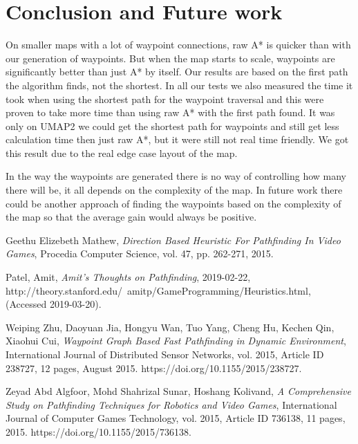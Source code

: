 \documentclass[a4paper]{article}
\begin{document}
{\section{Conclusion and Future work}
On smaller maps with a lot of waypoint connections, raw A* is quicker than with our generation of waypoints. But when the map starts to scale, waypoints are significantly better than just A* by itself.
Our results are based on the first path the algorithm finds, not the shortest. In all our tests we also measured the time it took when using the shortest path for the waypoint traversal and this were proven to take more time than using raw A* with the first path found. It was only on UMAP2 we could get the shortest path for waypoints and still get less calculation time then just raw A*, but it were still not real time friendly. We got this result due to the real edge case layout of the map.
	
In the way the waypoints are generated there is no way of controlling how many there will be, it all depends on the complexity of the map. In future work there could be another approach of finding the waypoints based on the complexity of the map so that the average gain would always be positive.

\pagebreak
\begin{thebibliography}{9}

  Geethu Elizebeth Mathew,
  \textit{Direction Based Heuristic For Pathfinding In Video Games},
  Procedia Computer Science, vol. 47, pp. 262-271,
  2015.

   Patel, Amit,
  \textit{Amit's Thoughts on Pathfinding},
  2019-02-22,
  http://theory.stanford.edu/~amitp/GameProgramming/\newline Heuristics.html,
  (Accessed 2019-03-20).

  Weiping Zhu, Daoyuan Jia, Hongyu Wan, Tuo Yang, Cheng Hu, Kechen Qin, Xiaohui Cui,
  \textit{Waypoint Graph Based Fast Pathfinding in Dynamic Environment},
  International Journal of Distributed Sensor Networks, vol. 2015, Article ID 238727, 12 pages,
  August 2015. https://doi.org/10.1155/2015/238727.

  Zeyad Abd Algfoor, Mohd Shahrizal Sunar, Hoshang Kolivand,
  \textit{A Comprehensive Study on Pathfinding Techniques for Robotics and Video Games},
  International Journal of Computer Games Technology, vol. 2015, Article ID 736138, 11 pages,
  2015. https://doi.org/10.1155/2015/736138.


\end{thebibliography}}
\end{document}
